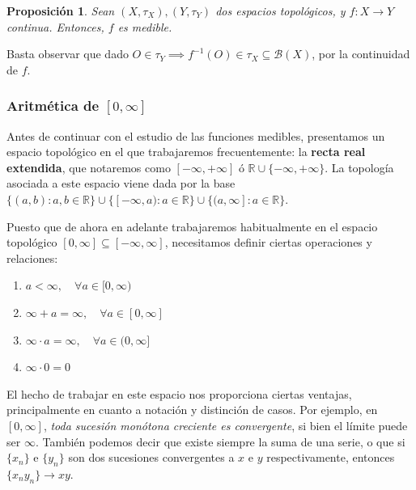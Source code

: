 \documentclass[11pt, a4paper]{article}
\makeatletter
\newif\IfInSansMode
\let\oldsf\sffamily
\renewcommand*{\sffamily}{\oldsf\mathversion{sans}\InSansModetrue}
\let\oldnorm\normalfont
\renewcommand*{\normalfont}{\oldnorm\InSansModefalse\mathversion{normal}}
\newcommand{\xn}{\{x_n\}}
\renewenvironment{proof}[1][\proofname] {\par\pushQED{\qed}\normalfont\topsep6\p@\@plus6\p@\relax\trivlist\item[\hskip\labelsep\itshape\sffamily#1\@addpunct{.}]\ignorespaces}{\popQED\endtrivlist\@endpefalse}
\theoremstyle{theorem-style}
\newtheorem{nprop}{Proposición}[section]
\theoremstyle{definition-style}
\theoremstyle{remark-style}
\theoremstyle{example-style}
\newenvironment{nlist}
{\begin{enumerate}
    \renewcommand\labelenumi{(\emph{\roman{enumi})}}}
  {\end{enumerate}}
\makeatother
\begin{document}
\begin{nprop} Sean $(X,\tau_X), (Y, \tau_Y)$ dos espacios topológicos, y $f:X\longrightarrow Y$ continua. Entonces, $f$ es medible.
\end{nprop}

\begin{proof} Basta observar que dado $O \in \tau_Y \implies f^{-1}(O) \in \tau_X \subseteq \mathcal B(X)$, por la continuidad de $f$.
\end{proof}


\subsubsection{Aritmética de $[0,\infty]$}

Antes de continuar con el estudio de las funciones medibles, presentamos un espacio topológico en el que trabajaremos frecuentemente: la \textbf{recta real extendida}, que notaremos como $[-\infty,+\infty]$ ó $\mathbb{R} \cup \{-\infty, +\infty\}$. La topología asociada a este espacio viene dada por la base $\{(a,b): a,b \in \mathbb{R}\} \cup \{[-\infty, a): a \in \mathbb{R}\} \cup \{(a,\infty]: a \in \mathbb{R}\}$.

Puesto que de ahora en adelante trabajaremos habitualmente en el espacio topológico $[0,\infty] \subseteq [-\infty,\infty]$, necesitamos definir ciertas operaciones y relaciones:
\begin{nlist}
\item $a < \infty, \quad \forall a \in [0,\infty)$
\item $\infty + a = \infty, \quad \forall a \in [0,\infty]$
\item $\infty \cdot a = \infty, \quad \forall a \in (0,\infty]$
\item $\infty \cdot 0 = 0$
\end{nlist}

El hecho de trabajar en este espacio nos proporciona ciertas ventajas, principalmente en cuanto a notación y distinción de casos. Por ejemplo, en $[0, \infty]$, \textit{toda sucesión monótona creciente es convergente}, si bien el límite puede ser $\infty$. También podemos decir que existe siempre la suma de una serie, o que si $\xn$ e $\{y_n\}$ son dos sucesiones convergentes a $x$ e $y$ respectivamente, entonces $\{x_ny_n\} \to xy$.
\end{document}
